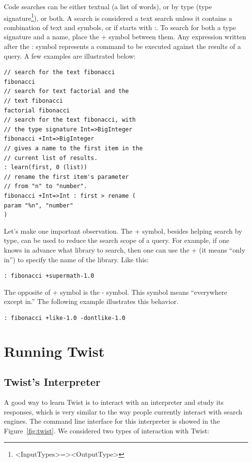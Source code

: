 Code searches can be either textual (a list of words), or by type (type signature\footnote{<InputTypes>=><OutputType>}), or both. A search is considered a text search unless it contains a combination of text and symbols, or if starts with :. To search for both a type signature and a name, place the + symbol between them. Any expression written after the : symbol represents a command to be executed against the results of a query. A few examples are illustrated below:

\begin{verbatim}
// search for the text fibonacci	
fibonacci
// search for text factorial and the 
// text fibonacci
factorial fibonacci
// search for the text fibonacci, with 
// the type signature Int=>BigInteger 
fibonacci +Int=>BigInteger 
// gives a name to the first item in the 
// current list of results.
: learn(first, 0 (list))
// rename the first item's parameter 
// from "n" to "number".
fibonacci +Int=>Int : first > rename (
param "%n", "number"
) 
\end{verbatim}
	 
Let's make one important observation. The + symbol, besides helping search by type, can be used to reduce the search scope of a query. For example, if one knows in advance what library to search, then one can use the + (it means ``only in'') to specify the name of the library. Like this:

\begin{verbatim}
: fibonacci +supermath-1.0 
\end{verbatim}

The opposite of + symbol is the - symbol. This symbol means ``everywhere except in.'' The following example illustrates this behavior.

\begin{verbatim}
: fibonacci +like-1.0 -dontlike-1.0
\end{verbatim}

\section{Running Twist}
\label{sec:running}

\subsection{Twist's Interpreter}
\label{sec:interpreter}

A good way to learn Twist is to interact with an interpreter and study its responses, which is very similar to the way people currently interact with search engines. The command line interface for this interpreter is showed in the Figure~\ref{fig:twist}. We considered two types of interaction with Twist: 

